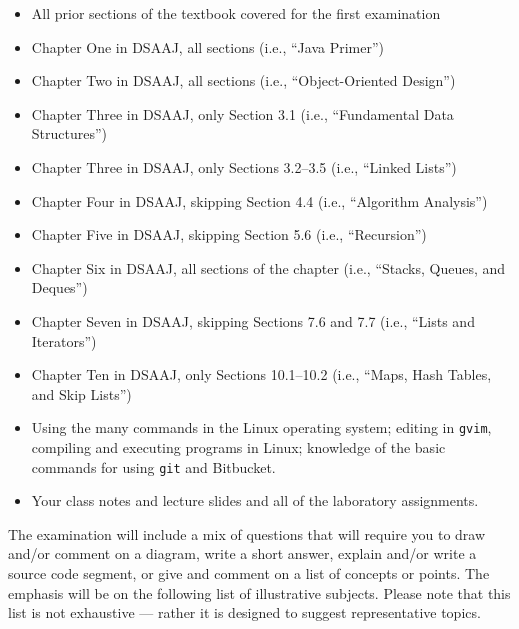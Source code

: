 \begin{itemize}

  \itemsep 0in

  \item All prior sections of the textbook covered for the first examination

  \item Chapter One in DSAAJ, all sections (i.e., ``Java Primer'')

  \item Chapter Two in DSAAJ, all sections (i.e., ``Object-Oriented Design'')

  \item Chapter Three in DSAAJ, only Section 3.1 (i.e., ``Fundamental Data Structures'')

  \item Chapter Three in DSAAJ, only Sections 3.2--3.5  (i.e., ``Linked Lists'')

  \item Chapter Four in DSAAJ, skipping Section 4.4 (i.e., ``Algorithm Analysis'')

  \item Chapter Five in DSAAJ, skipping Section 5.6 (i.e., ``Recursion'')

  \item Chapter Six in DSAAJ, all sections of the chapter (i.e., ``Stacks, Queues, and Deques'')

  \item Chapter Seven in DSAAJ, skipping Sections 7.6 and 7.7 (i.e., ``Lists and Iterators'')

  \item Chapter Ten in DSAAJ, only Sections 10.1--10.2 (i.e., ``Maps, Hash Tables, and Skip Lists'')

  \item Using the many commands in the Linux operating system; editing in {\tt gvim}, compiling and executing
    programs in Linux; knowledge of the basic commands for using {\tt git} and Bitbucket.

  \item Your class notes and lecture slides and all of the laboratory assignments.

\end{itemize}

\noindent The examination will include a mix of questions that will require you to draw and/or comment on a diagram,
write a short answer, explain and/or write a source code segment, or give and comment on a list of concepts or points.
The emphasis will be on the following list of illustrative subjects. Please note that this list is not exhaustive ---
rather it is designed to suggest representative topics.

